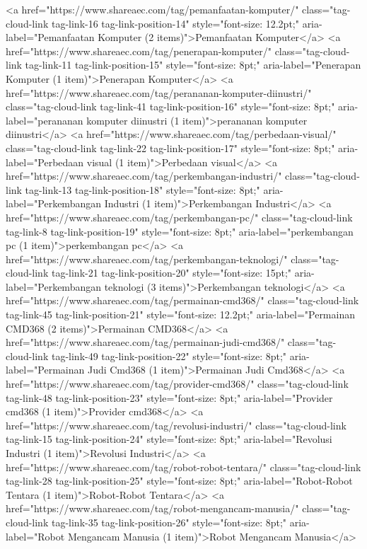 {<a href="https://www.shareaec.com/tag/pemanfaatan-komputer/" class="tag-cloud-link tag-link-16 tag-link-position-14" style="font-size: 12.2pt;" aria-label="Pemanfaatan Komputer (2 items)">Pemanfaatan Komputer</a>
<a href="https://www.shareaec.com/tag/penerapan-komputer/" class="tag-cloud-link tag-link-11 tag-link-position-15" style="font-size: 8pt;" aria-label="Penerapan Komputer (1 item)">Penerapan Komputer</a>
<a href="https://www.shareaec.com/tag/perananan-komputer-diinustri/" class="tag-cloud-link tag-link-41 tag-link-position-16" style="font-size: 8pt;" aria-label="perananan komputer diinustri (1 item)">perananan komputer diinustri</a>
<a href="https://www.shareaec.com/tag/perbedaan-visual/" class="tag-cloud-link tag-link-22 tag-link-position-17" style="font-size: 8pt;" aria-label="Perbedaan visual (1 item)">Perbedaan visual</a>
<a href="https://www.shareaec.com/tag/perkembangan-industri/" class="tag-cloud-link tag-link-13 tag-link-position-18" style="font-size: 8pt;" aria-label="Perkembangan Industri (1 item)">Perkembangan Industri</a>
<a href="https://www.shareaec.com/tag/perkembangan-pc/" class="tag-cloud-link tag-link-8 tag-link-position-19" style="font-size: 8pt;" aria-label="perkembangan pc (1 item)">perkembangan pc</a>
<a href="https://www.shareaec.com/tag/perkembangan-teknologi/" class="tag-cloud-link tag-link-21 tag-link-position-20" style="font-size: 15pt;" aria-label="Perkembangan teknologi (3 items)">Perkembangan teknologi</a>
<a href="https://www.shareaec.com/tag/permainan-cmd368/" class="tag-cloud-link tag-link-45 tag-link-position-21" style="font-size: 12.2pt;" aria-label="Permainan CMD368 (2 items)">Permainan CMD368</a>
<a href="https://www.shareaec.com/tag/permainan-judi-cmd368/" class="tag-cloud-link tag-link-49 tag-link-position-22" style="font-size: 8pt;" aria-label="Permainan Judi Cmd368 (1 item)">Permainan Judi Cmd368</a>
<a href="https://www.shareaec.com/tag/provider-cmd368/" class="tag-cloud-link tag-link-48 tag-link-position-23" style="font-size: 8pt;" aria-label="Provider cmd368 (1 item)">Provider cmd368</a>
<a href="https://www.shareaec.com/tag/revolusi-industri/" class="tag-cloud-link tag-link-15 tag-link-position-24" style="font-size: 8pt;" aria-label="Revolusi Industri (1 item)">Revolusi Industri</a>
<a href="https://www.shareaec.com/tag/robot-robot-tentara/" class="tag-cloud-link tag-link-28 tag-link-position-25" style="font-size: 8pt;" aria-label="Robot-Robot Tentara (1 item)">Robot-Robot Tentara</a>
<a href="https://www.shareaec.com/tag/robot-mengancam-manusia/" class="tag-cloud-link tag-link-35 tag-link-position-26" style="font-size: 8pt;" aria-label="Robot Mengancam Manusia (1 item)">Robot Mengancam Manusia</a>
}
